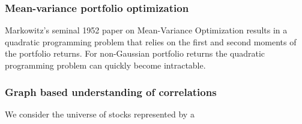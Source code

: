 \documentclass[12pt,a4paper]{cibb}
\begin{document}
\subsubsection{Mean-variance portfolio optimization}
Markowitz's seminal 1952 paper on Mean-Variance Optimization results in a quadratic programming problem that relies on the first and second moments of the portfolio returns. For non-Gaussian portfolio returns the quadratic programming problem can quickly become intractable. 



\subsubsection{Graph based understanding of correlations}
We consider the universe of stocks represented by a 

\footnotesize

 
\normalsize
\end{document}
